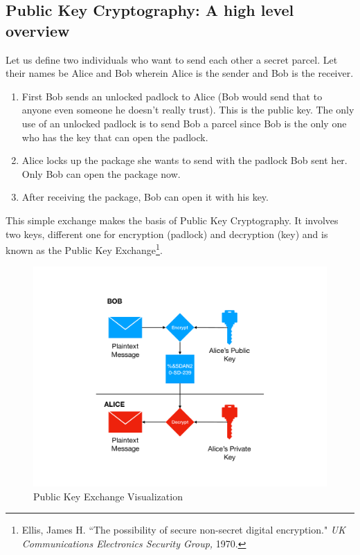 \documentclass[a4paper,12pt]{article}
\theoremstyle{definition}
\begin{document}
\subsection{Public Key Cryptography: A high level overview} \label{publickeyexchange}

Let us define two individuals who want to send each other a secret parcel. Let their names be Alice and Bob wherein Alice is the sender and Bob is the receiver.
\begin{enumerate}
	\item First Bob sends an unlocked padlock to Alice (Bob would send that to anyone even someone he doesn't really trust). This is the public key. The only use of an unlocked padlock is to send Bob a parcel since Bob is the only one who has the key that can open the padlock.
	\item Alice locks up the package she wants to send with the padlock Bob sent her. Only Bob can open the package now.
	\item After receiving the package, Bob can open it with his key.
\end{enumerate}

This simple exchange makes the basis of Public Key Cryptography. It involves two keys, different one for encryption (padlock) and decryption (key) and is known as the Public Key Exchange\footnote{Ellis, James H. ``The possibility of secure non-secret digital encryption." \textit{UK Communications Electronics Security Group,} 1970.}.
\begin{figure}[h]
	\includegraphics[width=\textwidth]{bobalice}
	\centering
	\caption{Public Key Exchange Visualization}
\end{figure}
\end{document}
